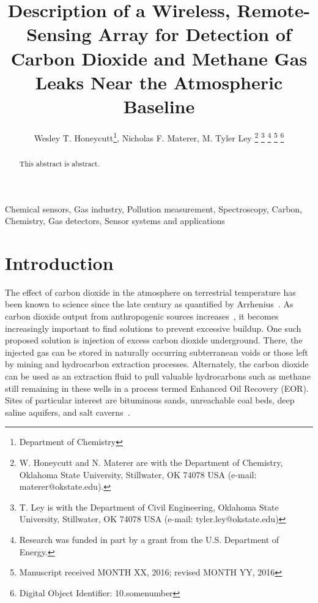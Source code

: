 \documentclass[journal]{IEEEtran}
\begin{document}
	\title{Description of a Wireless, Remote-Sensing Array for Detection of Carbon Dioxide and Methane Gas Leaks Near the Atmospheric Baseline}
	\author{Wesley T. Honeycutt\thanks{Department of Chemistry}, Nicholas F. Materer, M. Tyler Ley
		\thanks{W. Honeycutt and N. Materer are with the Department of Chemistry, Oklahoma State University, Stillwater, OK 74078 USA (e-mail: materer@okstate.edu).}%
		\thanks{T. Ley is with the Department of Civil Engineering, Oklahoma State University, Stillwater, OK 74078 USA (e-mail: tyler.ley@okstate.edu)}%
		\thanks{Research was funded in part by a grant from the U.S. Department of Energy.}%
		\thanks{Manuscript received MONTH XX, 2016; revised MONTH YY, 2016}%
		\thanks{Digital Object Identifier: 10.somenumber}}
	\maketitle
	
	\begin{abstract} 
		This abstract is abstract.
	\end{abstract}
	
	\begin{IEEEkeywords}
		Chemical sensors, Gas industry, Pollution measurement, Spectroscopy, Carbon, Chemistry, Gas detectors, Sensor systems and applications
	\end{IEEEkeywords}
	
	

\section{Introduction}

The effect of carbon dioxide in the atmosphere on terrestrial temperature has been known to science since the late  century as quantified by Arrhenius~\cite{arrhenius_xxxi._1896}.  As carbon dioxide output from anthropogenic sources increases~\cite{boden_global_2011}, it becomes increasingly important to find solutions to prevent excessive buildup.  One such proposed solution is injection of excess carbon dioxide underground.  There, the injected gas can be stored in naturally occurring subterranean voids or those left by mining and hydrocarbon extraction processes.  Alternately, the carbon dioxide can be used as an extraction fluid to pull valuable hydrocarbons such as methane still remaining in these wells in a process termed Enhanced Oil Recovery (EOR).  Sites of particular interest are bituminous sands, unreachable coal beds, deep saline aquifers, and salt caverns~\cite{bachu_sequestration_2000, white_separation_2003}.  
\end{document}
